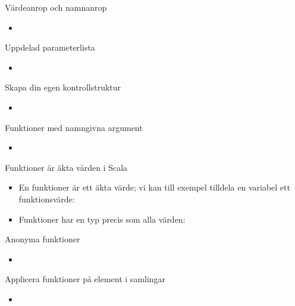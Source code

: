 \begin{Slide}{Värdeanrop och namnanrop}
\begin{itemize}
\item 
\end{itemize}
\end{Slide} 



\begin{Slide}{Uppdelad parameterlista}
\begin{itemize}
\item 
\end{itemize}
\end{Slide} 


\begin{Slide}{Skapa din egen kontrollstruktur}
\begin{itemize}
\item 
\end{itemize}
\end{Slide} 


\begin{Slide}{Funktioner med namngivna argument}
\begin{itemize}
\item 
\end{itemize}
\end{Slide} 



\begin{Slide}{Funktioner är äkta värden i Scala}
\begin{itemize}
\item En funktioner är ett äkta värde; vi kan till exempel tilldela en variabel ett funktionsvärde:
\item Funktioner har en typ precis som alla värden:
\end{itemize}
\end{Slide} 



\begin{Slide}{Anonyma funktioner}
\begin{itemize}
\item 
\end{itemize}
\end{Slide}




\begin{Slide}{Applicera funktioner på element i samlingar}
\begin{itemize}
\item 
\end{itemize}
\end{Slide} 




